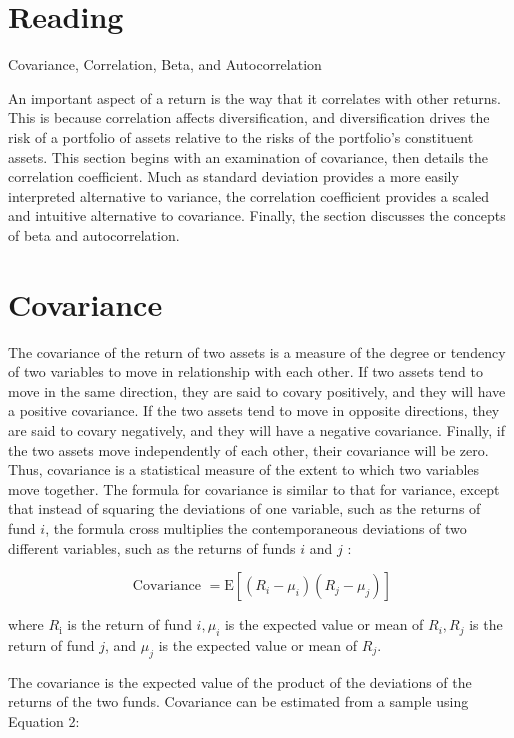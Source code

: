\documentclass[11pt]{article}
\begin{document}
\section*{Reading}
Covariance, Correlation, Beta, and Autocorrelation

An important aspect of a return is the way that it correlates with other returns. This is because correlation affects diversification, and diversification drives the risk of a portfolio of assets relative to the risks of the portfolio's constituent assets. This section begins with an examination of covariance, then details the correlation coefficient. Much as standard deviation provides a more easily interpreted alternative to variance, the correlation coefficient provides a scaled and intuitive alternative to covariance. Finally, the section discusses the concepts of beta and autocorrelation.

\section*{Covariance}
The covariance of the return of two assets is a measure of the degree or tendency of two variables to move in relationship with each other. If two assets tend to move in the same direction, they are said to covary positively, and they will have a positive covariance. If the two assets tend to move in opposite directions, they are said to covary negatively, and they will have a negative covariance. Finally, if the two assets move independently of each other, their covariance will be zero. Thus, covariance is a statistical measure of the extent to which two variables move together. The formula for covariance is similar to that for variance, except that instead of squaring the deviations of one variable, such as the returns of fund $i$, the formula cross multiplies the contemporaneous deviations of two different variables, such as the returns of funds $i$ and $j$ :


\begin{equation*}
\text { Covariance }=\mathrm{E}\left[\left(R_{i}-\mu_{i}\right)\left(R_{j}-\mu_{j}\right)\right] \tag{1}
\end{equation*}


where $R_{\mathrm{i}}$ is the return of fund $i, \mu_{i}$ is the expected value or mean of $R_{i}, R_{j}$ is the return of fund $j$, and $\mu_{j}$ is the expected value or mean of $R_{j}$.

The covariance is the expected value of the product of the deviations of the returns of the two funds. Covariance can be estimated from a sample using Equation 2:
\end{document}

